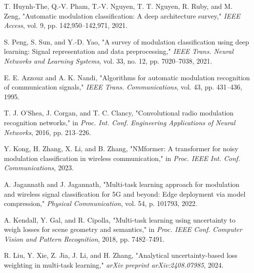 \documentclass[conference]{IEEEtran}
\begin{document}

\begin{thebibliography}{99}

T. Huynh-The, Q.-V. Pham, T.-V. Nguyen, T. T. Nguyen, R. Ruby, and M. Zeng, "Automatic modulation classification: A deep architecture survey," \textit{IEEE Access}, vol. 9, pp. 142,950--142,971, 2021.

S. Peng, S. Sun, and Y.-D. Yao, "A survey of modulation classification using deep learning: Signal representation and data preprocessing," \textit{IEEE Trans. Neural Networks and Learning Systems}, vol. 33, no. 12, pp. 7020--7038, 2021.

E. E. Azzouz and A. K. Nandi, "Algorithms for automatic modulation recognition of communication signals," \textit{IEEE Trans. Communications}, vol. 43, pp. 431--436, 1995.

T. J. O'Shea, J. Corgan, and T. C. Clancy, "Convolutional radio modulation recognition networks," in \textit{Proc. Int. Conf. Engineering Applications of Neural Networks}, 2016, pp. 213--226.

Y. Kong, H. Zhang, X. Li, and B. Zhang, "NMformer: A transformer for noisy modulation classification in wireless communication," in \textit{Proc. IEEE Int. Conf. Communications}, 2023.

A. Jagannath and J. Jagannath, "Multi-task learning approach for modulation and wireless signal classification for 5G and beyond: Edge deployment via model compression," \textit{Physical Communication}, vol. 54, p. 101793, 2022.

A. Kendall, Y. Gal, and R. Cipolla, "Multi-task learning using uncertainty to weigh losses for scene geometry and semantics," in \textit{Proc. IEEE Conf. Computer Vision and Pattern Recognition}, 2018, pp. 7482--7491.

R. Liu, Y. Xie, Z. Jia, J. Li, and H. Zhang, "Analytical uncertainty-based loss weighting in multi-task learning," \textit{arXiv preprint arXiv:2408.07985}, 2024.

\end{thebibliography}
\end{document}
